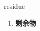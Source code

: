 
\begin{frame}
{\huge residue}
\begin{center}
\begin{enumerate}\Large
  \item \textbf{剩余物}
\end{enumerate}
\end{center}
\end{frame}
